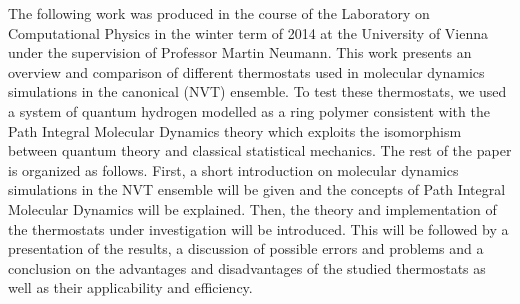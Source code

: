 The following work was produced in the course of the Laboratory on Computational Physics in the winter term of 2014 at the University of Vienna under the supervision of Professor Martin Neumann. This work presents an overview and comparison of different thermostats used in molecular dynamics simulations in the canonical (NVT) ensemble. To test these thermostats, we used a system of quantum hydrogen modelled as a ring polymer consistent with the Path Integral Molecular Dynamics theory which exploits the isomorphism between quantum theory and classical statistical mechanics.
The rest of the paper is organized as follows. First, a short introduction on molecular dynamics simulations in the NVT ensemble will be given and the concepts of Path Integral Molecular Dynamics will be explained. Then, the theory and implementation of the thermostats under investigation will be introduced. This will be followed by a presentation of the results, a discussion of possible errors and problems and a conclusion on the advantages and disadvantages of the studied thermostats as well as their applicability and efficiency. 
